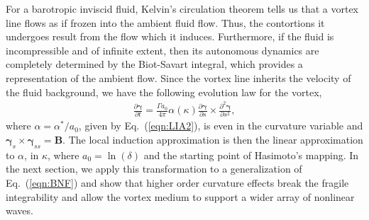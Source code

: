 \documentclass[aps,graphicx,reprint,onecolumn,12pt,tightenlines,longbibliography]{revtex4-1}
\begin{document}
For a barotropic inviscid fluid, Kelvin's circulation theorem tells us that a vortex line flows as if frozen into the ambient fluid flow. Thus, the contortions it undergoes result from the flow which it induces. Furthermore, if the fluid is incompressible and of infinite extent, then its autonomous dynamics are completely determined by the Biot-Savart integral, which provides a representation of the ambient flow. Since the vortex line inherits the velocity of the fluid background, we have the following evolution law for the vortex, 
%
\begin{align}\label{eqn:BNF}
\frac{\partial \bm{\gamma}}{\partial t} = \frac{\Gamma a_{0} }{4\pi} \alpha(\kappa) \frac{\partial \bm{\gamma}}{\partial s}\times \frac{\partial^{2} \bm{\gamma}}{\partial s^{2}},
\end{align}
%
where $\alpha = \alpha^{*}/a_{0}$, given by Eq.~(\ref{eqn:LIA2}), is even in the curvature variable and $\bm{\gamma}_{s}\times\bm{\gamma}_{ss}={\textbf{B}}$. The local induction approximation is then the linear approximation to $\alpha$, in $\kappa$, where $a_{0} = \ln(\delta)$ and the starting point of Hasimoto's mapping. In the next section, we apply this transformation to a generalization of Eq.~(\ref{eqn:BNF}) and show that higher order curvature effects break the fragile integrability and allow the vortex medium to support a wider array of nonlinear waves. 
\end{document}
